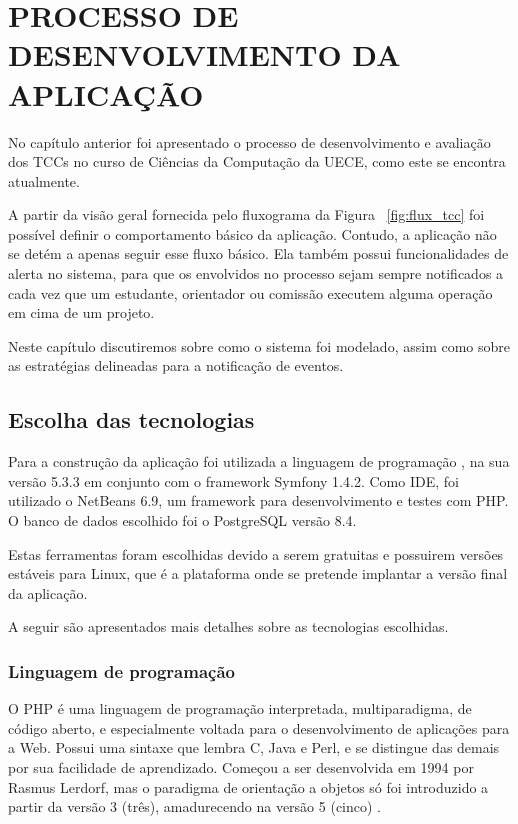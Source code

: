 \chapter{PROCESSO DE DESENVOLVIMENTO DA APLICAÇÃO}
\label{cha:desenvolvimento}

No capítulo anterior foi apresentado o processo de desenvolvimento
e avaliação dos TCCs no curso de Ciências da Computação da UECE, como este se 
encontra atualmente. 

A partir da visão geral fornecida pelo fluxograma 
da Figura ~\ref{fig:flux_tcc} foi possível definir o comportamento básico 
da aplicação. Contudo, a aplicação não se 
detém a apenas seguir esse fluxo básico. Ela também possui funcionalidades
de alerta no sistema, para que os envolvidos no processo sejam sempre 
notificados a cada vez que um estudante, orientador ou comissão executem alguma
operação em cima de um projeto.

Neste capítulo discutiremos sobre como o sistema foi modelado, assim como sobre as
estratégias delineadas para a notificação de eventos.

\section{Escolha das tecnologias}
Para a construção da aplicação foi utilizada a linguagem de programação , na 
sua versão 5.3.3 em conjunto com o framework Symfony 1.4.2. Como IDE, foi utilizado 
o NetBeans 6.9, um framework para desenvolvimento e testes com PHP. O 
banco de dados escolhido foi o PostgreSQL versão 8.4.

Estas ferramentas foram escolhidas devido a serem gratuitas e possuirem versões 
estáveis para Linux, que é a plataforma onde se pretende implantar a versão 
final da aplicação. 

A seguir são apresentados mais detalhes sobre as tecnologias escolhidas.

\label{tecnologias}
\subsection{Linguagem de programação}
O PHP é uma linguagem de programação interpretada, multiparadigma, de código aberto, e especialmente
voltada para o desenvolvimento de aplicações para a Web. Possui uma sintaxe que lembra
C, Java e Perl, e se distingue das demais por sua facilidade de aprendizado.
Começou a ser desenvolvida em 1994 por Rasmus Lerdorf, mas o paradigma de orientação
a objetos só foi introduzido a partir da versão 3 (três), amadurecendo na versão 5 (cinco) \cite{PHP, Wiki:PHP}.

